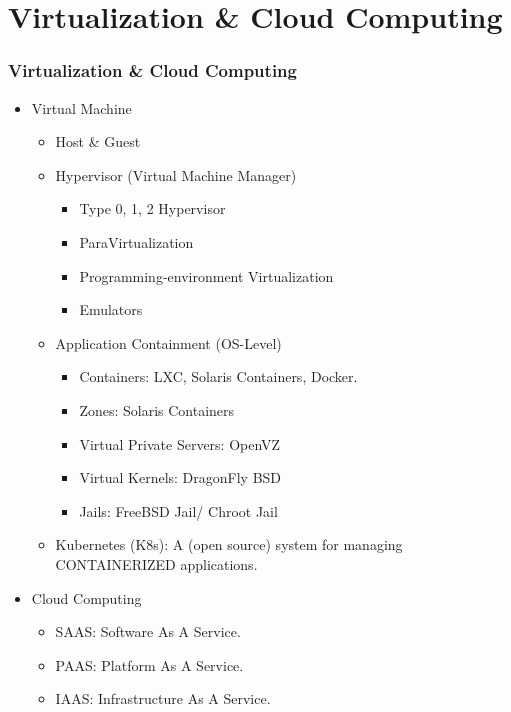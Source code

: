 \documentclass[xcolor=table, notheorems, hyperref={pdfpagelabels=false}]{beamer}
\begin{document}
\section{Virtualization \& Cloud Computing}
\begin{frame}
\frametitle{Virtualization \& Cloud Computing}
\begin{itemize}
\item Virtual Machine
\begin{itemize}
\item Host \& Guest
\item Hypervisor (Virtual Machine Manager)
\begin{itemize}
\item Type 0, 1, 2 Hypervisor
\item ParaVirtualization
\item Programming-environment Virtualization
\item Emulators
\end{itemize}
\item Application Containment (OS-Level)
\begin{itemize}
\item Containers: LXC, Solaris Containers, Docker.
\item Zones: Solaris Containers
\item Virtual Private Servers: OpenVZ
\item Virtual Kernels: DragonFly BSD
\item Jails: FreeBSD Jail/ Chroot Jail
\end{itemize}
\item Kubernetes (K8s): A (open source) system for managing CONTAINERIZED applications.
\end{itemize}
\item Cloud Computing
\begin{itemize}
\item SAAS: Software As A Service.
\item PAAS: Platform As A Service.
\item IAAS: Infrastructure As A Service.
\end{itemize}
\end{itemize}
\end{frame}

\end{document}
